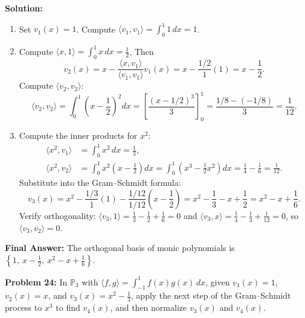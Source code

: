 \documentclass[11pt, letterpaper]{article}
\theoremstyle{definition}
\theoremstyle{remark}
\begin{document}
\textbf{Solution:}
\begin{enumerate}[label=\textbf{Step \arabic*:}]
    \item Set $v_1(x) = 1$. Compute $\langle v_1, v_1 \rangle = \int_0^1 1\,dx = 1$.
    \item Compute $\langle x, 1 \rangle = \int_0^1 x\,dx = \frac{1}{2}$. Then
    \[
        v_2(x) = x - \frac{\langle x, v_1 \rangle}{\langle v_1, v_1 \rangle} v_1(x) = x - \frac{1/2}{1}(1) = x - \frac{1}{2}.
    \]
    Compute $\langle v_2, v_2 \rangle$:
    \[
        \langle v_2, v_2 \rangle = \int_0^1 \left(x - \frac{1}{2}\right)^2 dx = \left[ \frac{(x - 1/2)^3}{3} \right]_0^1 = \frac{1/8 - (-1/8)}{3} = \frac{1}{12}.
    \]
    \item Compute the inner products for $x^2$:
    \begin{align*}
        \langle x^2, v_1 \rangle &= \int_0^1 x^2\,dx = \frac{1}{3}, \\
        \langle x^2, v_2 \rangle &= \int_0^1 x^2 \left(x - \frac{1}{2}\right) dx = \int_0^1 \left(x^3 - \frac{1}{2}x^2\right) dx = \frac{1}{4} - \frac{1}{6} = \frac{1}{12}.
    \end{align*}
    Substitute into the Gram--Schmidt formula:
    \[
        v_3(x) = x^2 - \frac{1/3}{1}(1) - \frac{1/12}{1/12}\left(x - \frac{1}{2}\right) = x^2 - \frac{1}{3} - x + \frac{1}{2} = x^2 - x + \frac{1}{6}.
    \]
    Verify orthogonality: $\langle v_3, 1 \rangle = \frac{1}{3} - \frac{1}{2} + \frac{1}{6} = 0$ and $\langle v_3, x \rangle = \frac{1}{4} - \frac{1}{3} + \frac{1}{12} = 0$, so $\langle v_3, v_2 \rangle = 0$.
\end{enumerate}
\textbf{Final Answer:} The orthogonal basis of monic polynomials is $\left\{ 1,\ x - \frac{1}{2},\ x^2 - x + \frac{1}{6} \right\}$.

\vspace{0.8em}

\textbf{Problem 24:} In $\mathbb{P}_3$ with $\langle f, g \rangle = \int_{-1}^1 f(x) g(x)\,dx$, given $v_1(x) = 1$, $v_2(x) = x$, and $v_3(x) = x^2 - \frac{1}{3}$, apply the next step of the Gram--Schmidt process to $x^3$ to find $v_4(x)$, and then normalize $v_3(x)$ and $v_4(x)$.
\end{document}
